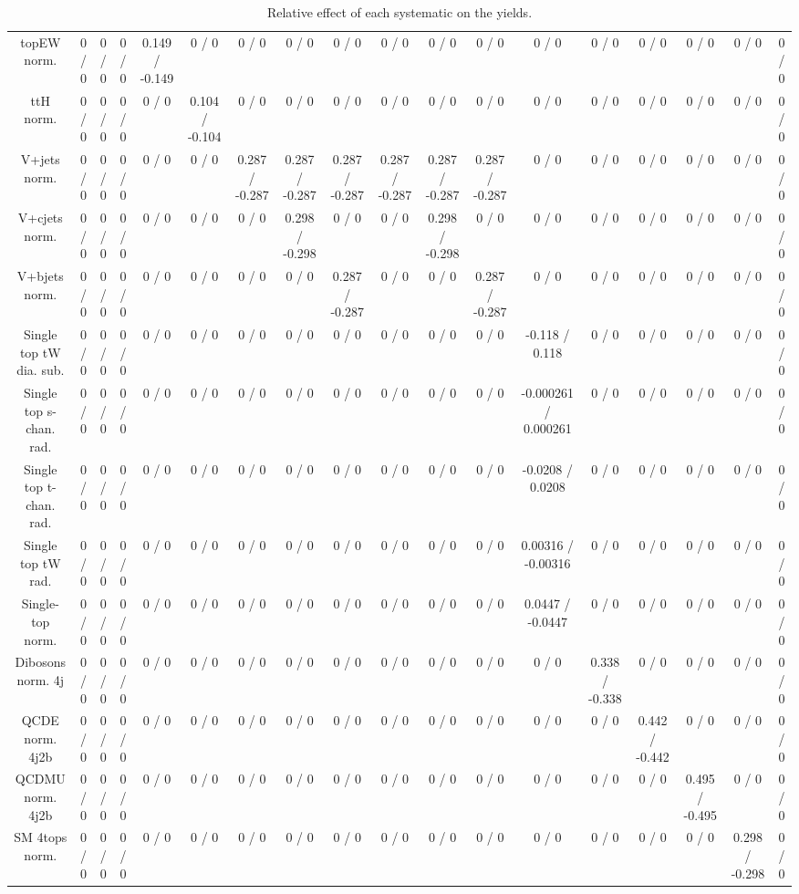 \documentclass[10pt]{article}
\begin{document}
\begin{table}[htbp]
\begin{center}
\begin{tabular}{|c|c|c|c|c|c|c|c|c|c|c|c|c|c|c|c|c|c|}
  topEW norm. & 0 / 0 & 0 / 0 & 0 / 0 & 0.149 / -0.149 & 0 / 0 & 0 / 0 & 0 / 0 & 0 / 0 & 0 / 0 & 0 / 0 & 0 / 0 & 0 / 0 & 0 / 0 & 0 / 0 & 0 / 0 & 0 / 0 & 0 / 0 \\ 
  ttH norm. & 0 / 0 & 0 / 0 & 0 / 0 & 0 / 0 & 0.104 / -0.104 & 0 / 0 & 0 / 0 & 0 / 0 & 0 / 0 & 0 / 0 & 0 / 0 & 0 / 0 & 0 / 0 & 0 / 0 & 0 / 0 & 0 / 0 & 0 / 0 \\ 
  V+jets norm. & 0 / 0 & 0 / 0 & 0 / 0 & 0 / 0 & 0 / 0 & 0.287 / -0.287 & 0.287 / -0.287 & 0.287 / -0.287 & 0.287 / -0.287 & 0.287 / -0.287 & 0.287 / -0.287 & 0 / 0 & 0 / 0 & 0 / 0 & 0 / 0 & 0 / 0 & 0 / 0 \\ 
  V+cjets norm. & 0 / 0 & 0 / 0 & 0 / 0 & 0 / 0 & 0 / 0 & 0 / 0 & 0.298 / -0.298 & 0 / 0 & 0 / 0 & 0.298 / -0.298 & 0 / 0 & 0 / 0 & 0 / 0 & 0 / 0 & 0 / 0 & 0 / 0 & 0 / 0 \\ 
  V+bjets norm. & 0 / 0 & 0 / 0 & 0 / 0 & 0 / 0 & 0 / 0 & 0 / 0 & 0 / 0 & 0.287 / -0.287 & 0 / 0 & 0 / 0 & 0.287 / -0.287 & 0 / 0 & 0 / 0 & 0 / 0 & 0 / 0 & 0 / 0 & 0 / 0 \\ 
  Single top tW dia. sub. & 0 / 0 & 0 / 0 & 0 / 0 & 0 / 0 & 0 / 0 & 0 / 0 & 0 / 0 & 0 / 0 & 0 / 0 & 0 / 0 & 0 / 0 & -0.118 / 0.118 & 0 / 0 & 0 / 0 & 0 / 0 & 0 / 0 & 0 / 0 \\ 
  Single top s-chan. rad. & 0 / 0 & 0 / 0 & 0 / 0 & 0 / 0 & 0 / 0 & 0 / 0 & 0 / 0 & 0 / 0 & 0 / 0 & 0 / 0 & 0 / 0 & -0.000261 / 0.000261 & 0 / 0 & 0 / 0 & 0 / 0 & 0 / 0 & 0 / 0 \\ 
  Single top t-chan. rad. & 0 / 0 & 0 / 0 & 0 / 0 & 0 / 0 & 0 / 0 & 0 / 0 & 0 / 0 & 0 / 0 & 0 / 0 & 0 / 0 & 0 / 0 & -0.0208 / 0.0208 & 0 / 0 & 0 / 0 & 0 / 0 & 0 / 0 & 0 / 0 \\ 
  Single top tW rad. & 0 / 0 & 0 / 0 & 0 / 0 & 0 / 0 & 0 / 0 & 0 / 0 & 0 / 0 & 0 / 0 & 0 / 0 & 0 / 0 & 0 / 0 & 0.00316 / -0.00316 & 0 / 0 & 0 / 0 & 0 / 0 & 0 / 0 & 0 / 0 \\ 
  Single-top norm. & 0 / 0 & 0 / 0 & 0 / 0 & 0 / 0 & 0 / 0 & 0 / 0 & 0 / 0 & 0 / 0 & 0 / 0 & 0 / 0 & 0 / 0 & 0.0447 / -0.0447 & 0 / 0 & 0 / 0 & 0 / 0 & 0 / 0 & 0 / 0 \\ 
  Dibosons norm. 4j & 0 / 0 & 0 / 0 & 0 / 0 & 0 / 0 & 0 / 0 & 0 / 0 & 0 / 0 & 0 / 0 & 0 / 0 & 0 / 0 & 0 / 0 & 0 / 0 & 0.338 / -0.338 & 0 / 0 & 0 / 0 & 0 / 0 & 0 / 0 \\ 
  QCDE norm. 4j2b & 0 / 0 & 0 / 0 & 0 / 0 & 0 / 0 & 0 / 0 & 0 / 0 & 0 / 0 & 0 / 0 & 0 / 0 & 0 / 0 & 0 / 0 & 0 / 0 & 0 / 0 & 0.442 / -0.442 & 0 / 0 & 0 / 0 & 0 / 0 \\ 
  QCDMU norm. 4j2b & 0 / 0 & 0 / 0 & 0 / 0 & 0 / 0 & 0 / 0 & 0 / 0 & 0 / 0 & 0 / 0 & 0 / 0 & 0 / 0 & 0 / 0 & 0 / 0 & 0 / 0 & 0 / 0 & 0.495 / -0.495 & 0 / 0 & 0 / 0 \\ 
  SM 4tops norm. & 0 / 0 & 0 / 0 & 0 / 0 & 0 / 0 & 0 / 0 & 0 / 0 & 0 / 0 & 0 / 0 & 0 / 0 & 0 / 0 & 0 / 0 & 0 / 0 & 0 / 0 & 0 / 0 & 0 / 0 & 0.298 / -0.298 & 0 / 0 \\ 
\hline 
\end{tabular} 
\caption{Relative effect of each systematic on the yields.} 
\end{center} 
\end{table} 
\end{document}
